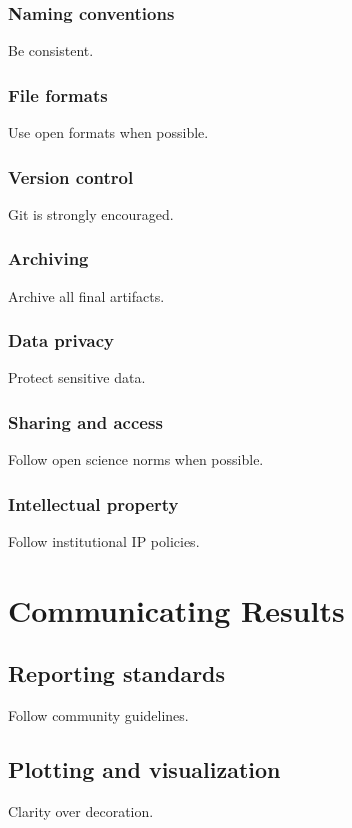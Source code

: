 \documentclass[11pt]{article}
\begin{document}
\subsubsection{Naming conventions}
Be consistent.

\subsubsection{File formats}
Use open formats when possible.

\subsubsection{Version control}
Git is strongly encouraged.

\subsubsection{Archiving}
Archive all final artifacts.

\subsubsection{Data privacy}
Protect sensitive data.

\subsubsection{Sharing and access}
Follow open science norms when possible.

\subsubsection{Intellectual property}
Follow institutional IP policies.

\section{Communicating Results}

\subsection{Reporting standards}
Follow community guidelines.

\subsection{Plotting and visualization}
Clarity over decoration.
\end{document}
